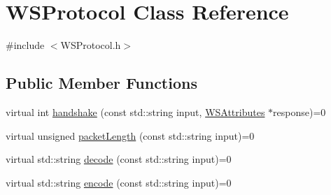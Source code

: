 \hypertarget{classWSProtocol}{\section{\-W\-S\-Protocol \-Class \-Reference}
\label{classWSProtocol}
}


{\ttfamily \#include $<$\-W\-S\-Protocol.\-h$>$}

\subsection*{\-Public \-Member \-Functions}
\begin{DoxyCompactItemize}
\item 
virtual int \hyperlink{classWSProtocol_ae1d5dd0058d39a5e8a80ec8f60663ea3}{handshake} (const std\-::string input, \hyperlink{structWSAttributes}{\-W\-S\-Attributes} $\ast$response)=0
\item 
virtual unsigned \hyperlink{classWSProtocol_a4e976c3c52a9b3d742308b9cb796d9ab}{packet\-Length} (const std\-::string input)=0
\item 
virtual std\-::string \hyperlink{classWSProtocol_a2ed88d5543e4c813a4da2aab5ab23021}{decode} (const std\-::string input)=0
\item 
virtual std\-::string \hyperlink{classWSProtocol_aa28337f807bd5b0182e321eb700088cf}{encode} (const std\-::string input)=0
\end{DoxyCompactItemize}


